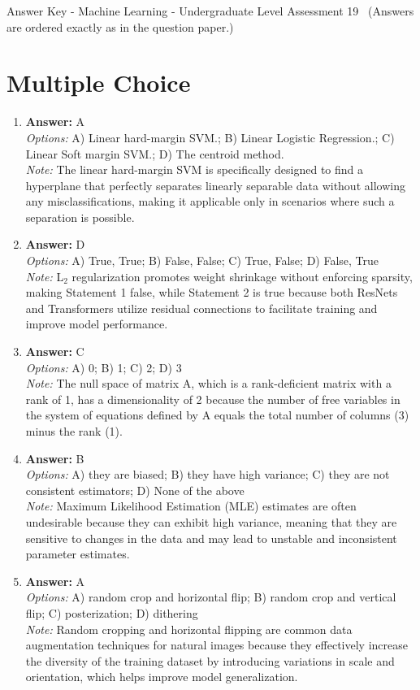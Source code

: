 \documentclass[12pt]{article}
\begin{document}
\begin{center}
Answer Key - Machine Learning - Undergraduate Level Assessment 19 \
\small (Answers are ordered exactly as in the question paper.)
\end{center}

\section*{Multiple Choice}
\begin{enumerate}[label=\arabic*.]
\item \textbf{Answer:} A
\\ \textit{Options:} A) Linear hard-margin SVM.; B) Linear Logistic Regression.; C) Linear Soft margin SVM.; D) The centroid method.
\\ \textit{Note:} The linear hard-margin SVM is specifically designed to find a hyperplane that perfectly separates linearly separable data without allowing any misclassifications, making it applicable only in scenarios where such a separation is possible.
\item \textbf{Answer:} D
\\ \textit{Options:} A) True, True; B) False, False; C) True, False; D) False, True
\\ \textit{Note:} L$_{2}$ regularization promotes weight shrinkage without enforcing sparsity, making Statement 1 false, while Statement 2 is true because both ResNets and Transformers utilize residual connections to facilitate training and improve model performance.
\item \textbf{Answer:} C
\\ \textit{Options:} A) 0; B) 1; C) 2; D) 3
\\ \textit{Note:} The null space of matrix A, which is a rank-deficient matrix with a rank of 1, has a dimensionality of 2 because the number of free variables in the system of equations defined by A equals the total number of columns (3) minus the rank (1).
\item \textbf{Answer:} B
\\ \textit{Options:} A) they are biased; B) they have high variance; C) they are not consistent estimators; D) None of the above
\\ \textit{Note:} Maximum Likelihood Estimation (MLE) estimates are often undesirable because they can exhibit high variance, meaning that they are sensitive to changes in the data and may lead to unstable and inconsistent parameter estimates.
\item \textbf{Answer:} A
\\ \textit{Options:} A) random crop and horizontal flip; B) random crop and vertical flip; C) posterization; D) dithering
\\ \textit{Note:} Random cropping and horizontal flipping are common data augmentation techniques for natural images because they effectively increase the diversity of the training dataset by introducing variations in scale and orientation, which helps improve model generalization.
\end{enumerate}
\end{document}
